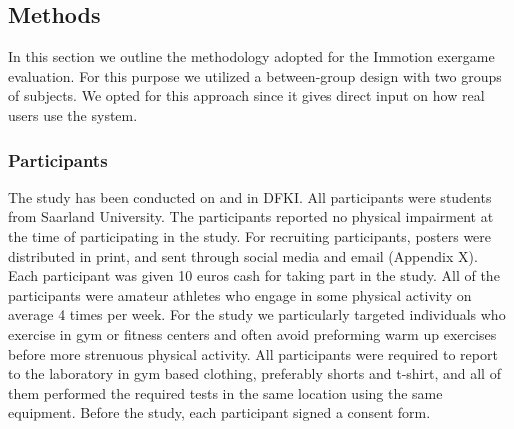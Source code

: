 \subsection{Methods} 
In this section we outline the methodology adopted for the Immotion exergame evaluation. For this purpose we utilized a between-group design with two groups of subjects. We opted for this approach since it gives direct input on how real users use the system. %
%
\subsubsection{Participants}
The study has been conducted on  and  in DFKI. All participants were students from Saarland University. The participants reported no physical impairment at the time of participating in the study. For recruiting participants, posters were distributed in print, and sent through social media and email (Appendix X). Each participant was given 10 euros cash for taking part in the study. All of the participants were amateur athletes who engage in some physical activity on average 4 times per week. For the study we particularly targeted individuals who exercise in gym or fitness centers and often avoid preforming warm up exercises before more strenuous physical activity. All participants were required to report to the laboratory in gym based clothing, preferably shorts and t-shirt, and all of them performed the required tests in the same location using the same equipment. Before the study, each participant signed a consent form.%
